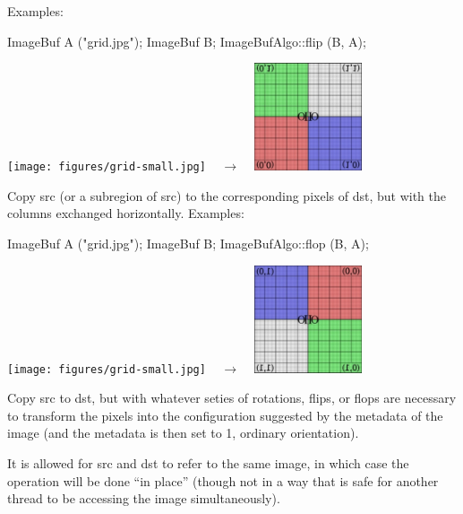 \smallskip
\noindent Examples:
\begin{code}
    ImageBuf A ("grid.jpg");
    ImageBuf B;
    ImageBufAlgo::flip (B, A);
\end{code}
\spc \texttt{[image: figures/grid-small.jpg]}
~ {\Huge $\rightarrow$} ~
\includegraphics[width=1.25in]{figures/flip.jpg} \\
\apiend


 
Copy {\cf src} (or a subregion of {\cf src}) to the corresponding pixels
of {\cf dst}, but with the columns exchanged horizontally.
\smallskip
\noindent Examples:
\begin{code}
    ImageBuf A ("grid.jpg");
    ImageBuf B;
    ImageBufAlgo::flop (B, A);
\end{code}
\spc \texttt{[image: figures/grid-small.jpg]}
~ {\Huge $\rightarrow$} ~
\includegraphics[width=1.25in]{figures/flop.jpg} \\
\apiend


 
Copy {\cf src} to {\cf dst}, but with whatever seties of rotations, flips,
or flops are necessary to transform the pixels into the configuration
suggested by the  metadata of the image (and the
 metadata is then set to 1, ordinary orientation).

It is allowed for {\cf src} and {\cf dst} to refer to the same image, in
which case the operation will be done ``in place'' (though not in a way
that is safe for another thread to be accessing the image simultaneously).

